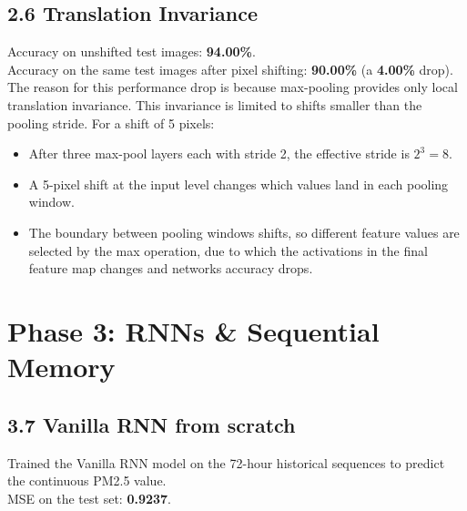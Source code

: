 \documentclass[12pt,a4paper]{article}
\begin{document}
\subsection{2.6 Translation Invariance}
\vspace{6pt}
\begin{resultbox}
Accuracy on unshifted test images: \textbf{94.00\%}. \\
Accuracy on the same test images after pixel shifting: \textbf{90.00\%} (a \textbf{4.00\%} drop).\\
The reason for this performance drop is because max-pooling provides only local translation invariance. This invariance is limited to shifts smaller than the pooling stride. For a shift of 5 pixels:
 \begin{itemize}
     \item After three max-pool layers each with stride 2, the effective stride is $2^3 = 8$.
     \item A 5-pixel shift at the input level changes which values land in each pooling window. 
     \item The boundary between pooling windows shifts, so different feature values are selected by the max operation, due to which the activations in the final feature map changes and networks accuracy drops.
 \end{itemize}
 
\end{resultbox}

\section{Phase 3: RNNs \& Sequential Memory}

\subsection{3.7 Vanilla RNN from scratch}
\vspace{6pt}
\begin{resultbox}
Trained the Vanilla RNN model on the 72-hour historical sequences to predict the continuous PM2.5 value. \\
MSE on the test set: \textbf{0.9237}.
\end{resultbox}
\end{document}
